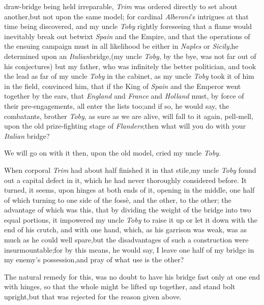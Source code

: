\documentclass{article}
\begin{document}
 draw-bridge being held
irreparable, \textit{Trim} was ordered directly to set about
another,\tsh but not upon the same model; for cardinal
\textit{Alberoni}’s intrigues at that time being discovered,
and my uncle \textit{Toby} rightly foreseeing that a flame would
inevitably break out betwixt \textit{Spain} and the Empire, and that
the operations of the ensuing campaign must in all likelihood be
either in \textit{Naples} or \textit{Sicily},\tsh he determined
upon an \textit{Italian}\break bridge,\tsk (my uncle \textit{Toby},
by the bye, was not far out of his conjectures)\tsh\break
but my father, who was infinitely the better politician, and
took the lead as far of my uncle \textit{Toby} in the cabinet,
as my uncle \textit{Toby} took it of him in the field,\tsh
convinced him, that if the King of \textit{Spain} and the
Emperor went together by the ears, that \textit{England} and
\textit{France} and \textit{Holland} must, by force of their
pre-engage\-ments, all enter the lists too;\tsh and if so, he
would say, the combatants, brother \textit{Toby}, as sure as we
are alive, will fall to it again, pell-mell, upon the old
prize-fighting stage of \textit{Flanders};\tsk then what will
you do with your \textit{Italian} bridge?

\tsk We will go on with it then, upon the old model, cried my
uncle \textit{Toby}.

When corporal \textit{Trim} had about half finished it in that
stile,\tsh my uncle \textit{Toby} found out a capital defect in
it, which he had never thoroughly considered before. It turned,
it seems, upon hinges at both ends of it, opening in the middle,
one half of which turning to one side of the fossè, and the
other, to the other; the advantage of which was this, that by
dividing the weight of the bridge into two equal portions, it
impowered my uncle \textit{Toby} to raise it up or let it down
with the end of his crutch, and with one hand, which, as his
garrison was weak, was as much as he could well spare,\tsk but
the disadvantages of such a construction were
insurmountable;\tsh for by this means, he would say, I leave one
half of my bridge in my enemy’s possession,\tsh and pray of what
use is the other?

The natural remedy for this, was no doubt to have his bridge
fast only at one end with hinges, so that the whole might be lifted
up together, and stand bolt upright,\tsh but that was
rejected for the reason given above.
\end{document}
